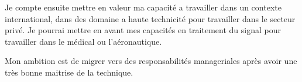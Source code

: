Je compte ensuite mettre en valeur ma capacité a travailler dans un contexte international, dans des domaine a haute technicité pour travailler dans le secteur privé. Je pourrai mettre en avant mes capacités en traitement du signal pour travailler dans le médical ou l'aéronautique.

Mon ambition est de migrer vers des responsabilités manageriales après avoir une très bonne maitrise de la technique.


